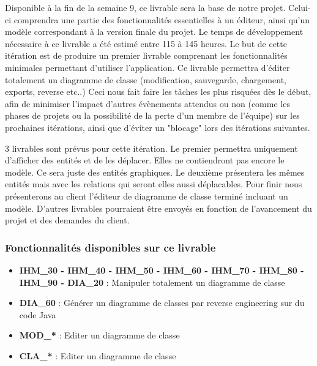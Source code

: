 \documentclass[hidelinks, 10pt,a4paper]{article}
\begin{document}
Disponible à la fin de la semaine 9, ce livrable sera la base de notre projet. 
Celui-ci comprendra une partie des fonctionnalités essentielles à un éditeur, ainsi 
qu'un modèle correspondant à la version finale du projet.
Le temps de développement nécessaire à ce livrable a été estimé entre 115 à 145 heures.
Le but de cette itération est de produire un premier livrable comprenant les fonctionnalités
minimales permettant d'utiliser l'application. Ce livrable permettra d'éditer totalement un diagramme de classe
(modification, sauvegarde, chargement, exports, reverse etc..)
Ceci nous fait faire les tâches les plus risquées dès le début, afin de minimiser
l'impact d'autres évènements attendus ou non (comme les phases de projets ou la possibilité de la perte
d'un membre de l'équipe) sur les prochaines itérations, ainsi que d'éviter un "blocage" lors des itérations
suivantes.

3 livrables sont prévus pour cette itération. Le premier permettra uniquement d'afficher des entités et de les déplacer.
Elles ne contiendront pas encore le modèle. Ce sera juste des entités graphiques.\newline
Le deuxième présentera les mêmes entités mais avec les relations qui seront elles aussi déplacables.\newline
Pour finir nous présenterons au client l'éditeur de diagramme de classe terminé incluant un modèle.\newline
D'autres livrables pourraient être envoyés en fonction de l'avancement du projet et des demandes du client.

\subsubsection{Fonctionnalités disponibles sur ce livrable}
\begin{itemize}
\item \textbf{IHM\_30 - IHM\_40 - IHM\_50 - IHM\_60 - IHM\_70 - IHM\_80 - IHM\_90 - DIA\_20} : Manipuler totalement un diagramme de classe
\item \textbf{DIA\_60} : Générer un diagramme de classes par reverse engineering sur du code Java
\item \textbf{MOD\_*} : Editer un diagramme de classe
 \item \textbf{CLA\_*} : Editer un diagramme de classe
\end{itemize}
\end{document}

